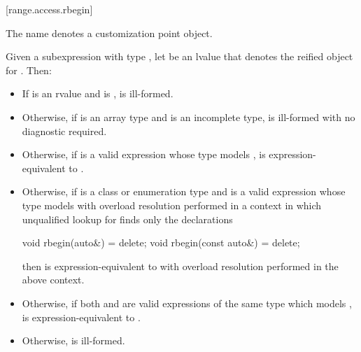 [range.access.rbegin]{}
%

\pnum
The name  denotes a customization point
object.

\pnum
Given a subexpression  with type ,
let  be an lvalue that denotes the reified object for .
Then:
\begin{itemize}
\item
  If  is an rvalue and
   is ,
   is ill-formed.

\item
  Otherwise, if  is an array type and
   is an incomplete type,
   is ill-formed with no diagnostic required.

\item
  Otherwise, if 
  is a valid expression whose type models
  ,
   is expression-equivalent to
  .

\item
  Otherwise, if  is a class or enumeration type and
  is a valid expression whose type models
  with overload resolution performed in a context in which
  unqualified lookup for  finds only the declarations
\begin{codeblock}
void rbegin(auto&) = delete;
void rbegin(const auto&) = delete;
\end{codeblock}
  then  is expression-equivalent to
  with overload resolution performed in the above context.

\item
  Otherwise, if both  and 
  are valid expressions of the same type which models
  ,
   is expression-equivalent to
  .

\item
  Otherwise,  is ill-formed.
\end{itemize}

